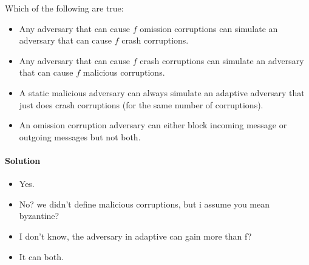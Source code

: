 \begin{xca}
    Which of the following are true:
    \begin{itemize} 
\item Any adversary that can cause $f$ omission corruptions can simulate an adversary that
 can cause $f$ crash corruptions.
\item  Any adversary that can cause $f$ crash corruptions can simulate an adversary that 
can cause $f$ malicious corruptions.
\item  A static malicious adversary can always simulate an adaptive 
adversary that just does crash corruptions (for the same number of corruptions).
\item  An omission corruption adversary can either block incoming message or outgoing messages but not both.
    \end{itemize}
    
\paragraph{Solution}
\begin{itemize}
    \item Yes.
    \item No? we didn't define malicious corruptions, but i assume you mean byzantine?
    \item I don't know, the adversary in adaptive can gain more than f?
    \item It can both.
\end{itemize}
\end{xca}


